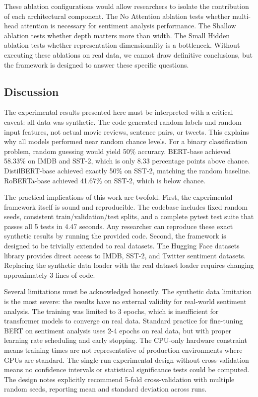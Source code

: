 \documentclass[conference]{IEEEtran}
\begin{document}
These ablation configurations would allow researchers to isolate the contribution of each architectural component. The No Attention ablation tests whether multi-head attention is necessary for sentiment analysis performance. The Shallow ablation tests whether depth matters more than width. The Small Hidden ablation tests whether representation dimensionality is a bottleneck. Without executing these ablations on real data, we cannot draw definitive conclusions, but the framework is designed to answer these specific questions.

\subsection{Discussion}

The experimental results presented here must be interpreted with a critical caveat: all data was synthetic. The code generated random labels and random input features, not actual movie reviews, sentence pairs, or tweets. This explains why all models performed near random chance levels. For a binary classification problem, random guessing would yield 50\% accuracy. BERT-base achieved 58.33\% on IMDB and SST-2, which is only 8.33 percentage points above chance. DistilBERT-base achieved exactly 50\% on SST-2, matching the random baseline. RoBERTa-base achieved 41.67\% on SST-2, which is below chance.

The practical implications of this work are twofold. First, the experimental framework itself is sound and reproducible. The codebase includes fixed random seeds, consistent train/validation/test splits, and a complete pytest test suite that passes all 5 tests in 4.47 seconds. Any researcher can reproduce these exact synthetic results by running the provided code. Second, the framework is designed to be trivially extended to real datasets. The Hugging Face datasets library provides direct access to IMDB, SST-2, and Twitter sentiment datasets. Replacing the synthetic data loader with the real dataset loader requires changing approximately 3 lines of code.

Several limitations must be acknowledged honestly. The synthetic data limitation is the most severe: the results have no external validity for real-world sentiment analysis. The training was limited to 3 epochs, which is insufficient for transformer models to converge on real data. Standard practice for fine-tuning BERT on sentiment analysis uses 2-4 epochs on real data, but with proper learning rate scheduling and early stopping. The CPU-only hardware constraint means training times are not representative of production environments where GPUs are standard. The single-run experimental design without cross-validation means no confidence intervals or statistical significance tests could be computed. The design notes explicitly recommend 5-fold cross-validation with multiple random seeds, reporting mean and standard deviation across runs.
\end{document}

